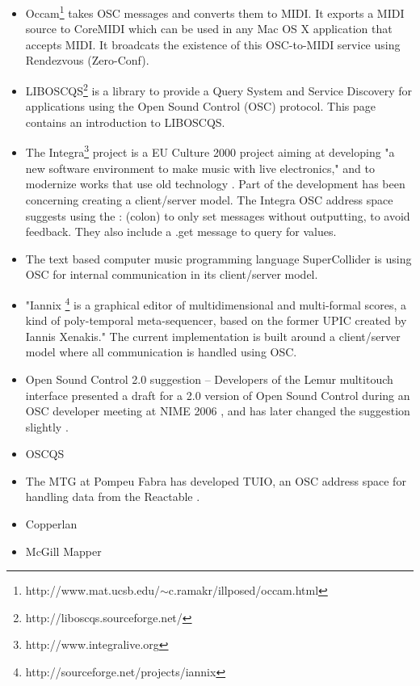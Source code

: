 \documentclass{sig-alternate}
\begin{document}
\begin{itemize}

	\item 	Occam\footnote{http://www.mat.ucsb.edu/$\sim$c.ramakr/illposed/occam.html} takes OSC messages and converts 
		them to 	MIDI. It exports a MIDI source to CoreMIDI which can be used in any Mac OS X application that 
		accepts MIDI. It broadcats the existence of this OSC-to-MIDI service using Rendezvous (Zero-Conf).
	\item 	LIBOSCQS\footnote{http://liboscqs.sourceforge.net/} is a library to provide a Query System and 
		Service Discovery for applications using the Open Sound Control (OSC) protocol\cite{Schmeder:2004oscqs}. 
		This page contains an introduction to LIBOSCQS.
	\item 	The Integra\footnote{http://www.integralive.org} project is a EU Culture 2000 project aiming at 
		developing "a new software environment to make music with live electronics," and to modernize works 
		that use old technology \cite{Bullock:2007}. Part of the development has been concerning creating a 
		client/server model.  The Integra OSC address space suggests using the : (colon) to only set 
		messages without outputting, to avoid feedback. They also include a .get message to query for values. 
	\item	The text based computer music programming language SuperCollider is using OSC for internal 
		communication in its client/server model. 
	\item 	"Iannix \footnote{http://sourceforge.net/projects/iannix} is a graphical editor of 
		multidimensional and multi-formal scores, a kind of poly-temporal meta-sequencer, based on the former 
		UPIC created by Iannis Xenakis." The current implementation is built around a client/server model 
		where all communication is handled using OSC. \cite{Coduys:2004}
	\item	Open Sound Control 2.0 suggestion -- Developers of the Lemur multitouch interface presented a draft 
		for a 2.0 version of Open Sound Control during an OSC developer meeting at 
		NIME 2006 \cite{Jazzmutant:2006}, and has later changed the suggestion slightly \cite{Jazzmutant:2007}. 
	\item   OSCQS \cite{Habets:2005}
	\item	The MTG at Pompeu Fabra has developed TUIO, an OSC address space for handling data from 
		the Reactable \cite{Kaltenbrunner:2005}.
	\item    Copperlan
	\item   McGill Mapper \cite{Malloch:2007}

\end{itemize}
\end{document}
